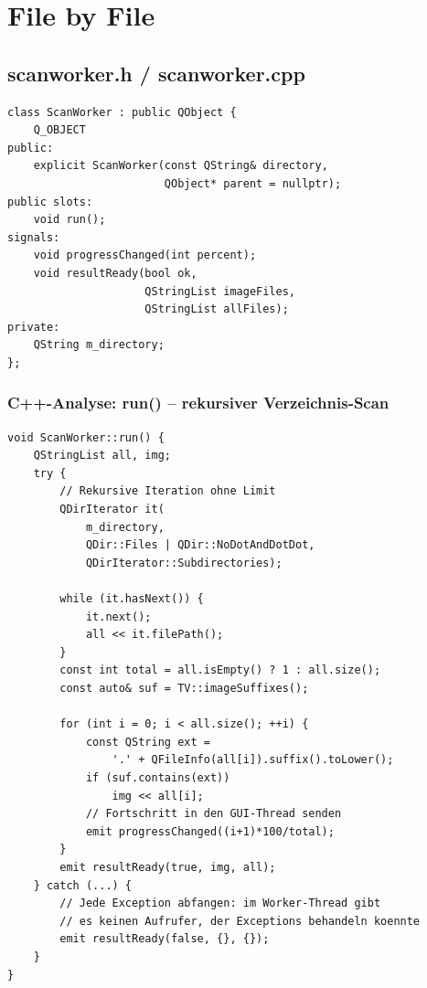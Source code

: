 \section{File by File}

\subsection{scanworker.h / scanworker.cpp}

\begin{lstlisting}[style=header, caption={scanworker.h}]
class ScanWorker : public QObject {
    Q_OBJECT
public:
    explicit ScanWorker(const QString& directory,
                        QObject* parent = nullptr);
public slots:
    void run();
signals:
    void progressChanged(int percent);
    void resultReady(bool ok,
                     QStringList imageFiles,
                     QStringList allFiles);
private:
    QString m_directory;
};
\end{lstlisting}

\subsubsection{C++-Analyse: run() -- rekursiver Verzeichnis-Scan}

\begin{lstlisting}[caption={ScanWorker::run -- QDirIterator mit Subdirectories}]
void ScanWorker::run() {
    QStringList all, img;
    try {
        // Rekursive Iteration ohne Limit
        QDirIterator it(
            m_directory,
            QDir::Files | QDir::NoDotAndDotDot,
            QDirIterator::Subdirectories);

        while (it.hasNext()) {
            it.next();
            all << it.filePath();
        }
        const int total = all.isEmpty() ? 1 : all.size();
        const auto& suf = TV::imageSuffixes();

        for (int i = 0; i < all.size(); ++i) {
            const QString ext =
                '.' + QFileInfo(all[i]).suffix().toLower();
            if (suf.contains(ext))
                img << all[i];
            // Fortschritt in den GUI-Thread senden
            emit progressChanged((i+1)*100/total);
        }
        emit resultReady(true, img, all);
    } catch (...) {
        // Jede Exception abfangen: im Worker-Thread gibt
        // es keinen Aufrufer, der Exceptions behandeln koennte
        emit resultReady(false, {}, {});
    }
}
\end{lstlisting}

